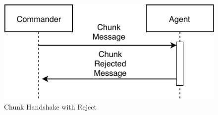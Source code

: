 \begin{figure}[h]
	\begin{center}
	\includegraphics[scale=1]{Resources/PDF/ChunkRejectHandshake}
	\caption{Chunk Handshake with Reject}
	\label{pic:ChunkRejectHandshake}
	\end{center}
\end{figure}